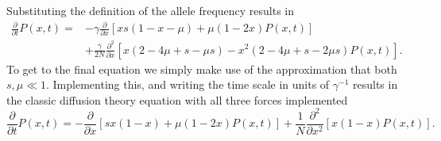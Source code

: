 Substituting the definition of the allele frequency results in
\begin{equation}
\begin{split}
    \frac{\partial}{\partial t} P(x, t)=
    &-\gamma \frac{\partial}{\partial x}[x s(1-x-\mu)+\mu(1-2 x) P(x, t)] \\
    &+\frac{\gamma}{2 N} \frac{\partial^{2}}{\partial x}
    \left[x(2-4 \mu+s-\mu s)-x^{2}(2-4 \mu+s-2 \mu s) P(x, t)\right].
\end{split}
\end{equation}
To get to the final equation we simply make use of the approximation that both
$s, \mu \ll 1$. Implementing this, and writing the time scale in units of
$\gamma^{-1}$ results in the classic diffusion theory equation with all three
forces implemented
\begin{equation}
    \frac{\partial}{\partial t} P(x, t) =
    -\frac{\partial}{\partial x}[s x(1-x) + \mu (1 - 2x) P(x, t)] 
    +\frac{1}{N} \frac{\partial^{2}}{\partial x^{2}}[x(1-x) P(x, t)].
\end{equation}
